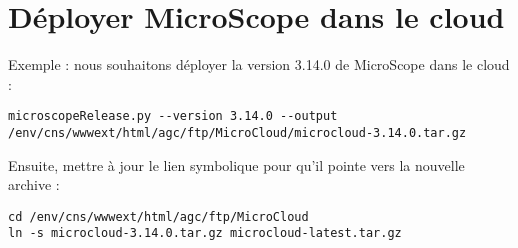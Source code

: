 \section{Déployer MicroScope dans le cloud}

Exemple : nous souhaitons déployer la version 3.14.0 de MicroScope dans le cloud :
\begin{lstlisting}[style=bash]
microscopeRelease.py --version 3.14.0 --output /env/cns/wwwext/html/agc/ftp/MicroCloud/microcloud-3.14.0.tar.gz
\end{lstlisting}
\bigskip

Ensuite, mettre à jour le lien symbolique pour qu'il pointe vers la nouvelle archive :
\begin{lstlisting}[style=bash]
cd /env/cns/wwwext/html/agc/ftp/MicroCloud
ln -s microcloud-3.14.0.tar.gz microcloud-latest.tar.gz
\end{lstlisting}

